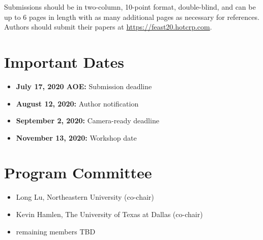 \documentclass[10pt,letterpaper]{article}
\begin{document}
Submissions should be in two-column, 10-point format, double-blind, and can be up to 6 pages in length with as many additional pages as necessary for references.
Authors should submit their papers at
\url{https://feast20.hotcrp.com}.

\section*{Important Dates}

{\large
\begin{itemize}
\item \textbf{July 17, 2020 AOE:} Submission deadline
\item \textbf{August 12, 2020:} Author notification
\item \textbf{September 2, 2020:} Camera-ready deadline
\item \textbf{November 13, 2020:} Workshop date
\end{itemize}
}

\section*{Program Committee}

\begin{itemize}
\item Long Lu, Northeastern University (co-chair)
\item Kevin Hamlen, The University of Texas at Dallas (co-chair)
\item remaining members TBD
\end{itemize}
\end{document}
